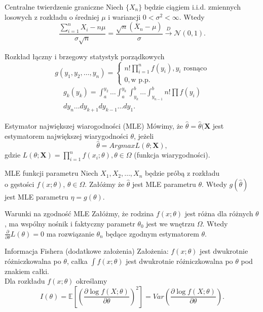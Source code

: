 \documentclass[avery5371, grid, frame]{flashcards}
\begin{document}
\begin{flashcard}[Twierdzenie]{Centralne twierdzenie graniczne}
    Niech $\{X_n\}$ będzie ciągiem i.i.d. zmiennych losowych z rozkładu o średniej $\mu$ i wariancji $0 < \sigma^2 < \infty$. Wtedy $$ \frac{\sum_{i=1}^{n} X_i - n\mu}{\sigma \sqrt{n}} = \frac{\sqrt{n}(\overline{X}_n - \mu)}{\sigma} \xrightarrow{D} \mathcal{N}(0, 1).$$
\end{flashcard}

\begin{flashcard}[Twierdzenie]{Rozkład łączny i brzegowy statystyk porządkowych}
    $$ g(y_1, y_2, \dots, y_n) =
    \begin{cases}
        n! \prod_{i=1}^{n}f(y_i), y_i \text{ rosnąco} \\
        0, \text{w p.p.}
    \end{cases} $$
    \begin{align*}
        g_k(y_k) = \int_a^{y_2} \dots \int_a^{y_k} \int_{y_k}^b \dots \int_{y_{n-1}}^b n! \prod f(y_i) \\ dy_n \dots dy_{k+1} dy_{k-1} \dots dy_1.
    \end{align*}
\end{flashcard}

\begin{flashcard}[Definicja]{Estymator największej wiarogodności (MLE)}
    Mówimy, że $\hat{\theta} = \hat{\theta}(\mathbf{X}$ jest estymatorem największej wiarygodności $\theta$, jeżeli $$ \hat{\theta} = Argmax L(\theta; \mathbf{X}),$$ gdzie $ L(\theta;\textbf{X}) = \prod_{i=1}^n f(x_i; \theta), \theta \in \Omega$ (funkcja wiarygodności).
\end{flashcard}

\begin{flashcard}[Twierdzenie]{MLE funkcji parametru}
    Niech $X_1, X_2, \dots, X_n$ będzie próbą z rozkładu \\ o gęstości $f(x; \theta)$, $\theta \in \Omega$. Załóżmy że $\hat{\theta}$ jest MLE parametru $\theta$. Wtedy $g(\hat{\theta})$ jest MLE parametru $\eta = g(\theta)$.
\end{flashcard}

\begin{flashcard}[Twierdzenie]{Warunki na zgodność MLE}
    Załóżmy, że rodzina $f(x;\theta)$ jest różna dla różnych $\theta$, ma wspólny nośnik i faktyczny parametr $\theta_0$ jest we wnętrzu $\Omega$. Wtedy $ \frac{\partial}{\partial \theta} L(\theta) = 0 $ ma rozwiązanie $\theta_n$ będące zgodnym estymatorem $\theta$.
\end{flashcard}
\begin{flashcard}[Definicja]{Informacja Fishera (dodatkowe założenia)}
    Założenia: $f(x; \theta)$ jest dwukrotnie różniczkowalna po $\theta$, całka $\int f(x;\theta)$ jest dwukrotnie różniczkowalna po $\theta$ pod znakiem całki. \\
    Dla rozkładu $f(x; \theta)$ określamy $$ I(\theta) = \mathbb{E} \left[  \left( \frac{\partial \log f(X; \theta)}{\partial \theta}\right)^2 \right] = Var \left( \frac{\partial \log f(X; \theta)}{\partial \theta} \right). $$
\end{flashcard}
\end{document}

